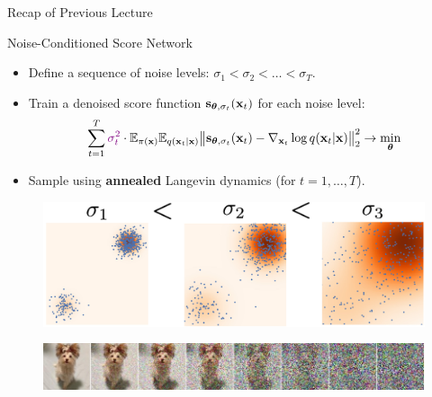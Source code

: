 \documentclass{beamer}
\begin{document}
\begin{frame}{Recap of Previous Lecture}
    \begin{block}{Noise-Conditioned Score Network}
        \begin{itemize}
            \item Define a sequence of noise levels: $\sigma_1 < \sigma_2 < \dots < \sigma_T$.
            \item Train a denoised score function $\mathbf{s}_{\boldsymbol{\theta}, \sigma_t}(\mathbf{x}_t)$ for each noise level:
            \vspace{-0.3cm}
            \[
                \sum_{t=1}^T {\color{violet}\sigma_t^2} \cdot \mathbb{E}_{\pi(\mathbf{x})} \mathbb{E}_{q(\mathbf{x}_t | \mathbf{x})}\bigl\| \mathbf{s}_{\boldsymbol{\theta}, \sigma_t}(\mathbf{x}_t) - \nabla_{\mathbf{x}_t} \log q(\mathbf{x}_t | \mathbf{x}) \bigr\|^2_2 \rightarrow \min_{\boldsymbol{\theta}}
            \]
            \vspace{-0.5cm}
            \item Sample using \textbf{annealed} Langevin dynamics (for $t=1, \dots, T$).
        \end{itemize}
    \end{block}
    \vspace{-0.3cm}
    \begin{figure}
        \includegraphics[width=0.55\linewidth]{figs/multi_scale}
    \end{figure}
    \vspace{-0.3cm}
    \begin{figure}
        \includegraphics[width=\linewidth]{figs/duoduo}
    \end{figure}
\end{frame}
\end{document}
